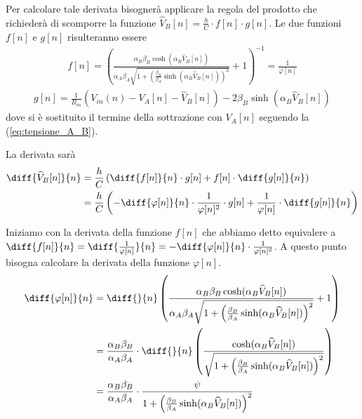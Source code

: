 		Per calcolare tale derivata bisognerà applicare la regola del prodotto che richiederà di scomporre la funzione $\widehat V_{B}[n] = \frac{h}{C}\cdot f[n]\cdot g[n]$.
		Le due funzioni $f[n]$ e $g[n]$ risulteranno essere
		\begin{equation}
			\begin{split}
				f[n] = \left(\frac{\alpha_{B}\beta_{B}\cosh(\alpha_{B}\widehat V_{B}[n])}{\alpha_{A}\beta_{A}\sqrt{1+\left(\frac{\beta_{B}}{\beta_{A}}\sinh(\alpha_{B}\widehat V_{B}[n])\right)^{2}}}+1\right)^{-1} = \frac{1}{\varphi[n]}
			\end{split}
		\end{equation}
		\begin{equation}
			\begin{split}
				g[n] = \frac{1}{R_{in}}\left(V_{in}(n)-V_{A}[n]-\widehat V_{B}[n]\right)-2\beta_{B}\sinh(\alpha_{B}\widehat V_{B}[n])
			\end{split}
		\end{equation}
		dove si è sostituito il termine della sottrazione con $V_{A}[n]$ seguendo la (\ref{eq:tensione_A_B}).

		La derivata sarà
		\begin{equation}
			\begin{split}
				\diff{\widehat V_{B}[n]}{n} &= \frac{h}{C}\left(\diff{f[n]}{n}\cdot g[n]+f[n]\cdot \diff{g[n]}{n}\right)\\
				&= \frac{h}{C}\left(-\diff{\varphi[n]}{n}\cdot\frac{1}{\varphi[n]^{2}}\cdot g[n]+\frac{1}{\varphi[n]}\cdot \diff{g[n]}{n}\right)
			\end{split}
		\end{equation}

		Iniziamo con la derivata della funzione $f[n]$ che abbiamo detto equivalere a $\diff{f[n]}{n} = \diff{\frac{1}{\varphi[n]}}{n} = -\diff{\varphi[n]}{n}\cdot\frac{1}{\varphi[n]^{2}}$. A questo punto bisogna calcolare la derivata della funzione $\varphi[n]$.
		\begin{equation}
			\begin{split}
				\diff{\varphi[n]}{n} &= \diff{}{n}\left(\frac{\alpha_{B}\beta_{B}\cosh(\alpha_{B}\widehat V_{B}[n])}{\alpha_{A}\beta_{A}\sqrt{1+\left(\frac{\beta_{B}}{\beta_{A}}\sinh(\alpha_{B}\widehat V_{B}[n])\right)^{2}}}+1\right)\\
				&= \frac{\alpha_{B}\beta_{B}}{\alpha_{A}\beta_{A}}\cdot\diff{}{n}\left(\frac{\cosh(\alpha_{B}\widehat V_{B}[n])}{\sqrt{1+\left(\frac{\beta_{B}}{\beta_{A}}\sinh(\alpha_{B}\widehat V_{B}[n])\right)^{2}}}\right)\\
				&= \frac{\alpha_{B}\beta_{B}}{\alpha_{A}\beta_{A}}\cdot\frac{\psi}{1+\left(\frac{\beta_{B}}{\beta_{A}}\sinh(\alpha_{B}\widehat V_{B}[n])\right)^{2}}
			\end{split}
		\end{equation}
		
